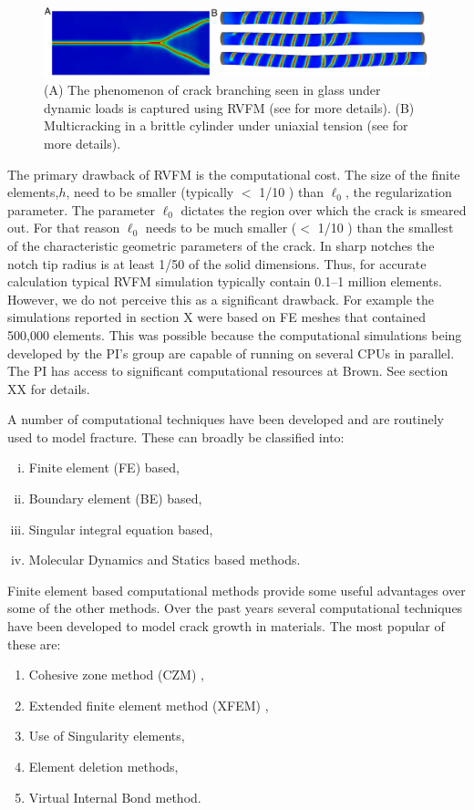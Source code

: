 \documentclass[11pt] {article}
\begin{document}
\begin{figure}
	\centering
	\includegraphics[width=1.0\textwidth]{./Fig4.pdf}
	\caption{(A) The phenomenon of crack branching seen in glass under dynamic loads is captured using RVFM (see \cite{borden_2012} for more details). (B) Multicracking in a brittle cylinder under uniaxial tension (see \cite{bourdin_2008} for more details). }
	\label{Fig4}
\end{figure}
The primary drawback of RVFM is the computational cost. The size of the finite elements,$h$, need to be smaller (typically $<$ 1/10 ) than $\ell_0$, the regularization parameter. The parameter $\ell_0$ dictates the region over which the crack is smeared out. For that reason $\ell_0$ needs to be much smaller ($<$ 1/10 ) than the smallest of the characteristic geometric parameters of the crack. In sharp notches the notch tip radius is at least 1/50 of the solid dimensions.
Thus, for accurate calculation typical RVFM simulation typically contain 0.1–1 million elements. However, we do not perceive this as a significant drawback. For example the simulations reported in section X were based on FE meshes that contained 500,000 elements. This was possible because the computational simulations being developed
by the PI’s group are capable of running on several CPUs in parallel. The PI has access to significant computational resources at Brown. See section XX for details.
\par
A number of computational techniques have been developed and are routinely used to model fracture. These can broadly be classified into:
\begin{enumerate}[(i)]
	\item Finite element (FE) based,
	\item Boundary element (BE) based,
	\item Singular integral equation based,
	\item Molecular Dynamics and Statics based methods.
\end{enumerate}
Finite element based computational methods provide some useful advantages over some of the other methods. Over the past years
several computational techniques have been developed to model crack growth in materials. The most popular of these are:
\begin{enumerate}
	\item Cohesive zone method (CZM) \cite{xu_1994,camacho_1996},
	\item Extended finite element method (XFEM) \cite{dolbow_1999},
	\item Use of Singularity elements,
	\item Element deletion methods,
	\item Virtual Internal Bond method.
\end{enumerate}
\end{document}
